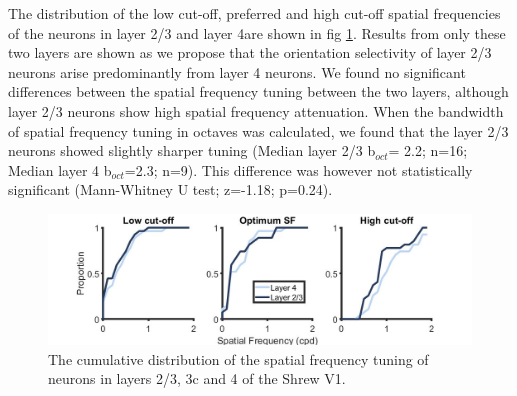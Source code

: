 The distribution of the low cut-off, preferred and high cut-off spatial frequencies of the neurons in layer 2/3 and layer 4are shown in fig \ref{fig:sftuning}. Results from only these two layers are shown as we propose that the orientation selectivity of layer 2/3 neurons arise predominantly from layer 4 neurons. We found no significant differences between the spatial frequency tuning between the two layers, although layer 2/3 neurons show high spatial frequency attenuation. When the bandwidth of spatial frequency tuning in octaves was calculated, we found that the layer 2/3 neurons showed slightly sharper tuning (Median layer 2/3 b$_{oct}$= 2.2; n=16; Median layer 4 b$_{oct}$=2.3; n=9). This difference was however not statistically significant (Mann-Whitney U test; z=-1.18; p=0.24).

		\begin{figure}[H]
		
		\includegraphics[width=\linewidth]{ShrewV1/sftuning_neurons_2.jpg}
		\caption{The cumulative distribution of the spatial frequency tuning of neurons in layers 2/3, 3c and 4 of the Shrew V1.}
		\label{fig:sftuning}
	\end{figure}

